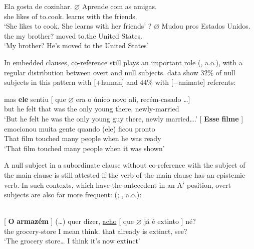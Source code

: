 \documentclass[output=paper]{langsci/langscibook}
\begin{document}
\ea%
    \label{ex:26.7}
    \ea
	\gll	Ela gosta de cozinhar. $\varnothing$ Aprende com as amigas.\\
    she likes of to.cook.      {}    learns    with the friends.\\
	\glt	\enquote*{She likes to cook. She learns with her friends}
    \ex
	? $\varnothing$  Mudou pros Estados Unidos.\\
    {} the my brother?  {} {}     moved to.the United States.\\
	\glt	\enquote*{My brother? He's moved to the United States}
    \z
\z

In embedded clauses, co-reference still plays an important role
(\citealt{Modesto2000,FigueiredoSilva2000,DuarteSoaresdaSilva2016}, a.o.), with
a regular distribution between overt and null subjects. 
data show 32\% of null subjects in this  pattern with [+human] and 44\%
with [$-$animate] referents:\largerpage[-1]

\ea%
    \label{ex:26.8}
    \ea
	\gll	mas \textbf{ele}\textbf{}  sentiu [ que
    $\varnothing$  era  o    único novo    ali,
    recém-casado \dots{}]\\
            but  he  felt   {} that {} was the only   young there, newly-married \\
	\glt	\enquote*{But he felt he was the only young guy there, newly married….}
    \ex
	\gll	{}[ \textbf{Esse} \textbf{filme} ] emocionou muita  gente   quando (ele) ficou pronto\\
            {} That film {} touched many  people  when \hphantom{(}he  was ready\\
	\glt	\enquote*{That film touched many  people when it was shown}
    \z
\z

A null subject in a subordinate clause without co-reference with the subject of
the main clause is still attested if the verb of the main clause has an
epistemic verb. In such contexts, which have the antecedent in an
A$'$-position, overt subjects are also far more frequent:
(\citealt{MoreiradaSilva1983};
\citealt{FigueiredoSilva1996,FigueiredoSilva2000}, a.o.):

\ea\label{ex:26.9}\\
    \gll	{}[ \textbf{O} \textbf{armazém} ] (\dots{}) {quer dizer,} \underline{acho} [ que $\varnothing$ já é extinto ] né?\\
    {} the grocery-store {} {} {I mean} think.\Fsg{} {} that {}  already is extinct, {} see?\\
    \glt	\enquote*{The grocery store\dots{} I think it's now extinct}
\z
\end{document}
